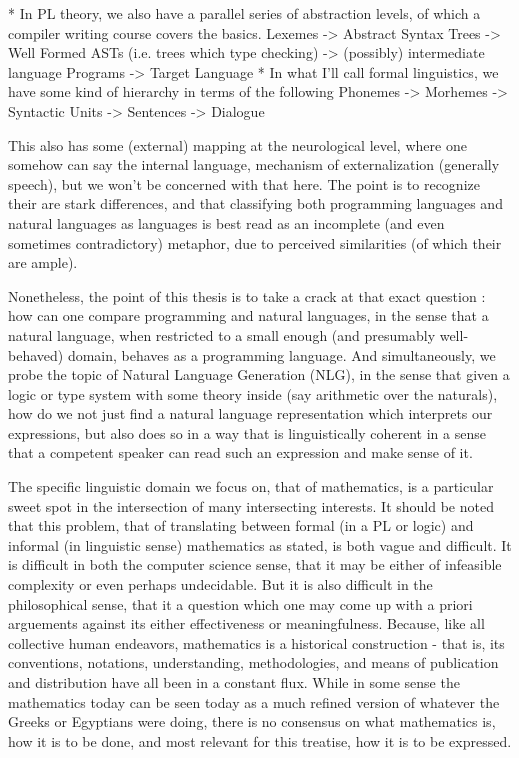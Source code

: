 \documentclass[11pt, a4paper]{article}
\begin{document}
* In PL theory, we also have a parallel series of abstraction levels, of which a
compiler writing course covers the basics. Lexemes -> Abstract Syntax Trees ->
Well Formed ASTs (i.e. trees which type checking) -> (possibly) intermediate
language Programs -> Target Language * In what I'll call formal linguistics, we
have some kind of hierarchy in terms of the following Phonemes -> Morhemes ->
Syntactic Units -> Sentences -> Dialogue

This also has some (external) mapping at the neurological level, where one
somehow can say the internal language, mechanism of externalization (generally
speech), but we won't be concerned with that here. The point is to recognize
their are stark differences, and that classifying both programming languages and
natural languages as languages is best read as an incomplete (and even sometimes
contradictory) metaphor, due to perceived similarities (of which their are
ample).

Nonetheless, the point of this thesis is to take a crack at that exact question
: how can one compare programming and natural languages, in the sense that a
natural language, when restricted to a small enough (and presumably
well-behaved) domain, behaves as a programming language. And simultaneously, we
probe the topic of Natural Language Generation (NLG), in the sense that given a
logic or type system with some theory inside (say arithmetic over the naturals),
how do we not just find a natural language representation which interprets our
expressions, but also does so in a way that is linguistically coherent in a
sense that a competent speaker can read such an expression and make sense of it.

The specific linguistic domain we focus on, that of mathematics, is a particular
sweet spot in the intersection of many intersecting interests. It should be
noted that this problem, that of translating between formal (in a PL or logic)
and informal (in linguistic sense) mathematics as stated, is both vague and
difficult. It is difficult in both the computer science sense, that it may be
either of infeasible complexity or even perhaps undecidable. But it is also
difficult in the philosophical sense, that it a question which one may come up
with a priori arguements against its either effectiveness or meaningfulness.
Because, like all collective human endeavors, mathematics is a historical
construction - that is, its conventions, notations, understanding,
methodologies, and means of publication and distribution have all been in a
constant flux. While in some sense the mathematics today can be seen today as a
much refined version of whatever the Greeks or Egyptians were doing, there is no
consensus on what mathematics is, how it is to be done, and most relevant for
this treatise, how it is to be expressed.
\end{document}
